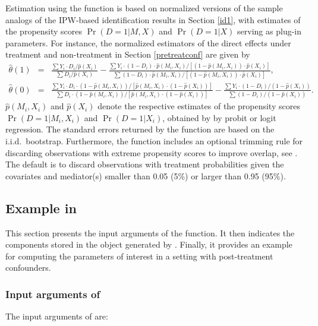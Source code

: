 \documentclass[nojss]{jss}
\begin{document}
Estimation using the function  is based on normalized versions of the sample analogs of the IPW-based identification results in Section \ref{id1}, with estimates of the propensity scores $\Pr (D=1|M,X)$ and $\Pr (D=1|X)$ serving as plug-in parameters. For instance, the normalized estimators of the direct effects under treatment and non-treatment in Section \ref{pretreatconf} are given by
\begin{eqnarray}
\hat{\theta}(1)&=&\frac{\sum Y_i \cdot D_i/\hat{p}(X_i)}{\sum D_i/\hat{p}(X_i)} - \frac{\sum Y_i \cdot (1-D_i)\cdot\hat{p}(M_i,X_i)/[(1-\hat{p}(M_i,X_i))\cdot\hat{p}(X_i)]}{\sum (1-D_i)\cdot\hat{p}(M_i,X_i)/[(1-\hat{p}(M_i,X_i))\cdot\hat{p}(X_i)]},\\
\hat{\theta}(0)&=&\frac{\sum Y_i \cdot D_i\cdot(1-\hat{p}(M_i,X_i))/[\hat{p}(M_i,X_i)\cdot(1-\hat{p}(X_i))]}{\sum D_i\cdot(1-\hat{p}(M_i,X_i))/[\hat{p}(M_i,X_i)\cdot(1-\hat{p}(X_i))]}-\frac{\sum Y_i \cdot (1-D_i)/(1-\hat{p}(X_i))}{\sum (1-D_i)/(1-\hat{p}(X_i))}. \nonumber
\end{eqnarray}
$\hat{p}(M_i,X_i)$ and $\hat{p}(X_i)$ denote the respective estimates of the propensity scores $\Pr(D=1|M_i,X_i)$ and  $\Pr(D=1|X_i)$, obtained by by probit or logit regression.  The standard errors returned by the function  are based on the i.i.d.\ bootstrap. Furthermore, the function  includes an optional trimming rule for discarding observations with extreme propensity scores to improve overlap, see \citet{CrHoImMi09}. The default is to discard observations with treatment probabilities given the covariates and mediator(s) smaller than 0.05 (5\%) or larger than 0.95 (95\%).

\subsection[{Example in R}]{Example in }

This section presents the input arguments of the  function. It then indicates the components stored in the object generated by . Finally, it provides an example for computing the parameters of interest in a setting with post-treatment confounders.

\subsubsection[{Input arguments of medweight}]{Input arguments of }

The input arguments of  are:
\end{document}
